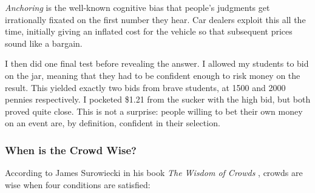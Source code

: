 \documentclass[10pt]{article}
\begin{document}
\textit{Anchoring} is the well-known cognitive bias that people's judgments get irrationally fixated on the first number they hear. Car dealers exploit this all the time, initially giving an inflated cost for the vehicle so that subsequent prices sound like a bargain.

I then did one final test before revealing the answer. I allowed my students to bid on the jar, meaning that they had to be confident enough to risk money on the result. This yielded exactly two bids from brave students, at 1500 and 2000 pennies respectively. I pocketed \$1.21 from the sucker with the high bid, but both proved quite close. This is not a surprise: people willing to bet their own money on an event are, by definition, confident in their selection.

\subsubsection{When is the Crowd Wise?}

According to James Surowiecki in his book \textit{The Wisdom of Crowds} \cite{Sur05}, crowds are wise when four conditions are satisfied:
\end{document}
